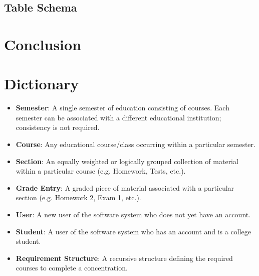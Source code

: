 \documentclass[12pt]{article}
\newcommand{\dictitem}[1]{\item \textbf{#1}:}
\newenvironment{dict}
{
    \begin{itemize}
}
{
    \end{itemize}
}
\begin{document}
\clearpage

\subsection{Table Schema}

\section{Conclusion}

\section{Dictionary}
\begin{dict}
    \dictitem{Semester} A single semester of education consisting of courses. Each semester can
    be associated with a different educational institution; consistency is not required.
    \dictitem{Course} Any educational course/class occurring within a particular semester.
    \dictitem{Section} An equally weighted or logically grouped collection of material within a
    particular course (e.g. Homework, Tests, etc.).
    \dictitem{Grade Entry} A graded piece of material associated with a particular section 
    (e.g. Homework 2, Exam 1, etc.).
    \dictitem{User} A new user of the software system who does not yet have an account.
    \dictitem{Student} A user of the software system who has an account and is a college student.
    \dictitem{Requirement Structure} A recursive structure defining the required courses to complete
    a concentration.
\end{dict}
\end{document}
